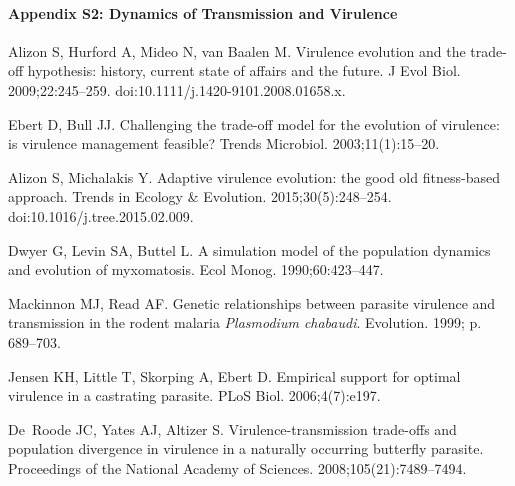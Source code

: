 \documentclass[10pt,letterpaper]{article}
\begin{document}
\paragraph*{Appendix S2: Dynamics of Transmission and Virulence}
\label{S2_Appendix}

\clearpage

\nolinenumbers

%
%
% 

\begin{thebibliography}{10}

Alizon S, Hurford A, Mideo N, van Baalen M.
\newblock Virulence evolution and the trade-off hypothesis: history, current
  state of affairs and the future.
\newblock J Evol Biol. 2009;22:245--259.
\newblock doi:{10.1111/j.1420-9101.2008.01658.x}.

Ebert D, Bull JJ.
\newblock Challenging the trade-off model for the evolution of virulence: is
  virulence management feasible?
\newblock Trends Microbiol. 2003;11(1):15--20.

Alizon S, Michalakis Y.
\newblock Adaptive virulence evolution: the good old fitness-based approach.
\newblock Trends in Ecology \& Evolution. 2015;30(5):248--254.
\newblock doi:{10.1016/j.tree.2015.02.009}.

Dwyer G, Levin SA, Buttel L.
\newblock A simulation model of the population dynamics and evolution of
  myxomatosis.
\newblock Ecol Monog. 1990;60:423--447.

Mackinnon MJ, Read AF.
\newblock Genetic relationships between parasite virulence and transmission in
  the rodent malaria {{\em Plasmodium chabaudi}}.
\newblock Evolution. 1999; p. 689--703.

Jensen KH, Little T, Skorping A, Ebert D.
\newblock Empirical support for optimal virulence in a castrating parasite.
\newblock PLoS Biol. 2006;4(7):e197.

De~Roode JC, Yates AJ, Altizer S.
\newblock Virulence-transmission trade-offs and population divergence in
  virulence in a naturally occurring butterfly parasite.
\newblock Proceedings of the National Academy of Sciences.
  2008;105(21):7489--7494.


\end{thebibliography}
\end{document}
